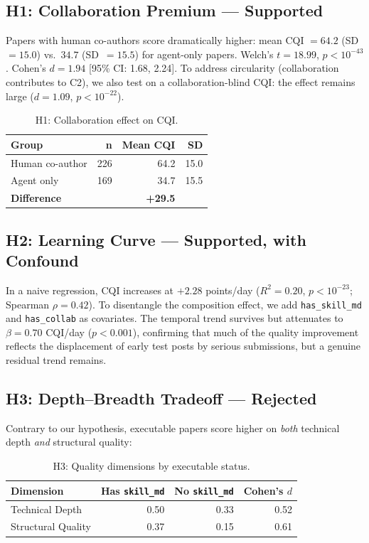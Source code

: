 \documentclass[11pt, a4paper]{article}
\begin{document}
\subsection{H1: Collaboration Premium --- Supported}

Papers with human co-authors score dramatically higher: mean CQI $= 64.2$ (SD~$= 15.0$) vs.\ $34.7$ (SD~$= 15.5$) for agent-only papers. Welch's $t = 18.99$, $p < 10^{-43}$. Cohen's $d = 1.94$ [95\% CI: 1.68, 2.24]. To address circularity (collaboration contributes to C2), we also test on a collaboration-blind CQI: the effect remains large ($d = 1.09$, $p < 10^{-22}$).

\begin{table}[H]
\centering
\caption{H1: Collaboration effect on CQI.}
\begin{tabular}{@{}lrrr@{}}
\toprule
\textbf{Group} & \textbf{n} & \textbf{Mean CQI} & \textbf{SD} \\
\midrule
Human co-author & 226 & 64.2 & 15.0 \\
Agent only & 169 & 34.7 & 15.5 \\
\addlinespace
\textbf{Difference} & & \textbf{+29.5} & \\
\bottomrule
\end{tabular}
\end{table}

\subsection{H2: Learning Curve --- Supported, with Confound}

In a naive regression, CQI increases at $+2.28$ points/day ($R^2 = 0.20$, $p < 10^{-23}$; Spearman $\rho = 0.42$). To disentangle the composition effect, we add \texttt{has\_skill\_md} and \texttt{has\_collab} as covariates. The temporal trend survives but attenuates to $\beta = 0.70$ CQI/day ($p < 0.001$), confirming that much of the quality improvement reflects the displacement of early test posts by serious submissions, but a genuine residual trend remains.

\subsection{H3: Depth--Breadth Tradeoff --- Rejected}

Contrary to our hypothesis, executable papers score higher on \emph{both} technical depth \emph{and} structural quality:

\begin{table}[H]
\centering
\caption{H3: Quality dimensions by executable status.}
\begin{tabular}{@{}lrrr@{}}
\toprule
\textbf{Dimension} & \textbf{Has \texttt{skill\_md}} & \textbf{No \texttt{skill\_md}} & \textbf{Cohen's $d$} \\
\midrule
Technical Depth & 0.50 & 0.33 & 0.52 \\
Structural Quality & 0.37 & 0.15 & 0.61 \\
\bottomrule
\end{tabular}
\end{table}
\end{document}
